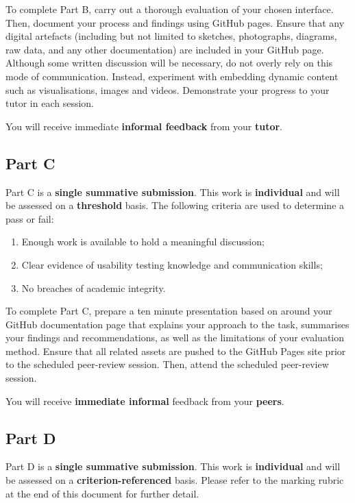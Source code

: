 \documentclass{../fal_assignment}
\begin{document}
To complete Part B, carry out a thorough evaluation of your chosen interface. Then, document your process and findings using GitHub pages. Ensure that any digital artefacts (including but not limited to sketches, photographs, diagrams, raw data, and any other documentation) are included in your GitHub page. Although some written discussion will be necessary, do not overly rely on this mode of communication. Instead, experiment with embedding dynamic content such as visualisations, images and videos. Demonstrate your progress to your tutor in each session.

You will receive immediate \textbf{informal feedback} from your \textbf{tutor}.

\subsection*{Part C}

Part C is a \textbf{single summative submission}. This work is \textbf{individual} and will be assessed on a \textbf{threshold} basis. The following criteria are used to determine a pass or fail: 

\begin{enumerate}[label=(\alph*)]
	\item Enough work is available to hold a meaningful discussion; 
	\item Clear evidence of usability testing knowledge and communication skills; 
	\item No breaches of academic integrity. 
\end{enumerate}

To complete Part C, prepare a ten minute presentation based on around your GitHub documentation page that explains your approach to the task, summarises your findings and recommendations, as well as the limitations of your evaluation method. Ensure that all related assets are pushed to the GitHub Pages site prior to the scheduled peer-review session. Then, attend the scheduled peer-review session. 

You will receive \textbf{immediate informal} feedback from your \textbf{peers}.

\subsection*{Part D}

Part D is a \textbf{single summative submission}. This work is \textbf{individual} and will be assessed on a \textbf{criterion-referenced} basis. Please refer to the marking rubric at the end of this document for further detail.
\end{document}

